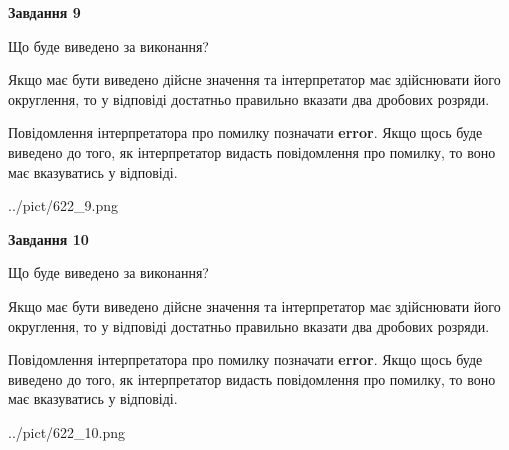 \documentclass[12pt, ukrainian]{article}
\begin{document}
{\begin {Large}
{\begin {center}\textbf{Завдання 9}\end {center}}\par
Що буде виведено за виконання? \par

Якщо має бути виведено дійсне значення та інтерпретатор має здійснювати його округлення, 
то у відповіді достатньо правильно вказати два дробових розряди.

Повідомлення інтерпретатора про помилку позначати \textbf{error}.
Якщо щось буде виведено до того, як інтерпретатор видасть повідомлення про помилку, 
то воно має вказуватись у відповіді. \par

\begin{center}
	{../pict/622_9.png}
\end{center}
\newpage

{\begin {center}\textbf{Завдання 10}\end {center}}\par
Що буде виведено за виконання? \par

Якщо має бути виведено дійсне значення та інтерпретатор має здійснювати його округлення, 
то у відповіді достатньо правильно вказати два дробових розряди.

Повідомлення інтерпретатора про помилку позначати \textbf{error}.
Якщо щось буде виведено до того, як інтерпретатор видасть повідомлення про помилку, 
то воно має вказуватись у відповіді. \par

\begin{center}
	{../pict/622_10.png}
\end{center}
\newpage

\end {Large}}
\end{document}
